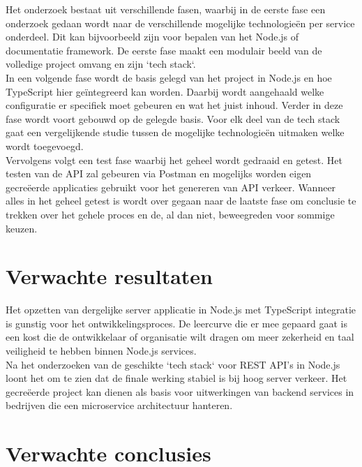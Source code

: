 Het onderzoek bestaat uit verschillende fasen, waarbij in de eerste fase een onderzoek gedaan wordt naar de verschillende mogelijke technologieën per service onderdeel. Dit kan bijvoorbeeld zijn voor bepalen van het Node.js of documentatie framework. De eerste fase maakt een modulair beeld van de volledige project omvang en zijn `tech stack`. \\
In een volgende fase wordt de basis gelegd van het project in Node.js en hoe TypeScript hier geïntegreerd kan worden. Daarbij wordt aangehaald welke configuratie er specifiek moet gebeuren en wat het juist inhoud. Verder in deze fase wordt voort gebouwd op de gelegde basis. Voor elk deel van de tech stack gaat een vergelijkende studie tussen de mogelijke technologieën uitmaken welke wordt toegevoegd. \\
Vervolgens volgt een test fase waarbij het geheel wordt gedraaid en getest. Het testen van de API zal gebeuren via Postman en mogelijks worden eigen gecreëerde applicaties gebruikt voor het genereren van API verkeer. Wanneer alles in het geheel getest is wordt over gegaan naar de laatste fase om conclusie te trekken over het gehele proces en de, al dan niet, beweegreden voor sommige keuzen.

\section{Verwachte resultaten}
\label{sec:verwachte_resultaten}

Het opzetten van dergelijke server applicatie in Node.js met TypeScript integratie is gunstig voor het ontwikkelingsproces. De leercurve die er mee gepaard gaat is een kost die de ontwikkelaar of organisatie wilt dragen om meer zekerheid en taal veiligheid te hebben binnen Node.js services. \\
Na het onderzoeken van de geschikte `tech stack` voor REST API's in Node.js loont het om te zien dat de finale werking stabiel is bij hoog server verkeer. Het gecreëerde project kan dienen als basis voor uitwerkingen van backend services in bedrijven die een microservice architectuur hanteren.

\section{Verwachte conclusies}
\label{sec:verwachte_conclusies}

